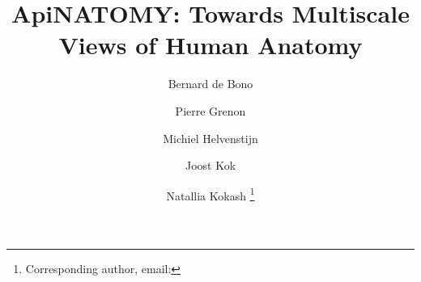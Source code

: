 \documentclass[runningheads]{llncs}
\begin{document}
\title{ApiNATOMY: Towards Multiscale Views of Human Anatomy}

\author{
  Bernard de Bono
  \and
  Pierre Grenon
  \and
  Michiel Helvenstijn
  \and 	
  Joost Kok
  \and
  Natallia Kokash
  \fnmsep
  \thanks{Corresponding author, email: }
}


\maketitle

\begin{abstract}
\end{abstract}









\end{document}

